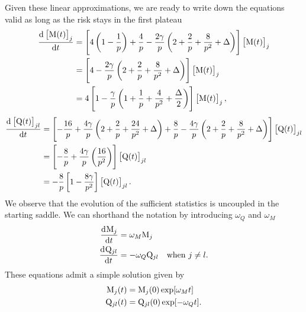 Given these linear approximations, we are ready to write down the equations valid 
as long as the risk stays in the first plateau
\begin{equation}\label{2305:eq:Msphericalgenericpk1}\begin{split}
  \dod{\left[\M{\left(t\right)}\right]_{j}}{t} &= 
    \left[
      4 \left(1 - \frac{1}{p}\right)
      +\frac{4}{p}-\frac{2 \gamma}{p} \left(2 +\frac{2}{p} + \frac{8}{p^2} + \Delta \right)
    \right] \left[\M{\left(t\right)}\right]_{j} \\
    &= \left[
      4 -\frac{2 \gamma}{p} \left(2 +\frac{2}{p} + \frac{8}{p^2} + \Delta \right)
    \right] \left[\M{\left(t\right)}\right]_{j} \\
    &= 4\left[
      1 -\frac{\gamma}{p} \left(1 +\frac{1}{p} + \frac{4}{p^2} + \frac\Delta2 \right)
    \right] \left[\M{\left(t\right)}\right]_{j} ,
\end{split}\end{equation}
\begin{equation}\label{2305:eq:Qsphericalgenericpk1}\begin{split}
  \dod{\left[\Q{\left(t\right)}\right]_{jl}}{t} &= 
    \left[
      -\frac{16}{p} +\frac{4 \gamma}{p} \left(2 +\frac{2}{p} + \frac{24}{p^2} + \Delta \right)
      +\frac{8}{p} -\frac{4 \gamma}{p}  \left(2 +\frac{2}{p} + \frac{8}{p^2} + \Delta \right)
    \right] \left[\Q{\left(t\right)}\right]_{jl} \\
  &= \left[
    -\frac{8}{p} +\frac{4 \gamma}{p} \left(\frac{16}{p^2}\right)
  \right] \left[\Q{\left(t\right)}\right]_{jl} \\
  &= -\frac{8}{p} \left[1-\frac{8\gamma}{p^2}\right] \left[\Q{\left(t\right)}\right]_{jl}.
\end{split}\end{equation}
We observe that the evolution of the sufficient statistics is uncoupled in the starting saddle.
We can shorthand the notation by introducing \(\omega_Q\) and \(\omega_M\)
\begin{equation}\begin{split}
    \dod{\M_j}{t} &= \omega_M \M_j \\
    \dod{\Q_{jl}}{t} &= -\omega_Q \Q_{jl} \quad\text{when } j\neq l.
\end{split}\end{equation}
These equations admit a simple solution given by
\begin{equation}\begin{split} \label{2305:eq:approx_suff_stat}
    \mathrm{M}_j{(t)} &= \mathrm{M}_j{(0)}\exp[\omega_M t]  \\
    \mathrm{Q}_{jl}{(t)} &= \mathrm{Q}_{jl}{(0)}\exp[-\omega_Q t].
\end{split}\end{equation}
 

